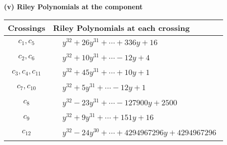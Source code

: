 \documentclass[1p]{elsarticle_modified}
\theoremstyle{definition}
\begin{document}
\newpage\renewcommand{\arraystretch}{1}
\flushleft \textbf{(v) Riley Polynomials at the component}\newline \\
\begin{tabular}{m{50pt}|m{274pt}}
Crossings & \hspace{64pt}Riley Polynomials at each crossing \\
\hline $$\begin{aligned}c_{1},c_{5}\end{aligned}$$&$\begin{aligned}
&y^{32}+26 y^{31}+\cdots+336 y+16
\end{aligned}$\\
\hline $$\begin{aligned}c_{2},c_{6}\end{aligned}$$&$\begin{aligned}
&y^{32}+10 y^{31}+\cdots-12 y+4
\end{aligned}$\\
\hline $$\begin{aligned}c_{3},c_{4},c_{11}\end{aligned}$$&$\begin{aligned}
&y^{32}+45 y^{31}+\cdots+10 y+1
\end{aligned}$\\
\hline $$\begin{aligned}c_{7},c_{10}\end{aligned}$$&$\begin{aligned}
&y^{32}+5 y^{31}+\cdots-12 y+1
\end{aligned}$\\
\hline $$\begin{aligned}c_{8}\end{aligned}$$&$\begin{aligned}
&y^{32}-23 y^{31}+\cdots-127900 y+2500
\end{aligned}$\\
\hline $$\begin{aligned}c_{9}\end{aligned}$$&$\begin{aligned}
&y^{32}+9 y^{31}+\cdots+151 y+16
\end{aligned}$\\
\hline $$\begin{aligned}c_{12}\end{aligned}$$&$\begin{aligned}
&y^{32}-24 y^{30}+\cdots+4294967296 y+4294967296
\end{aligned}$\\
\hline
\end{tabular}\\~\\
\end{document}
